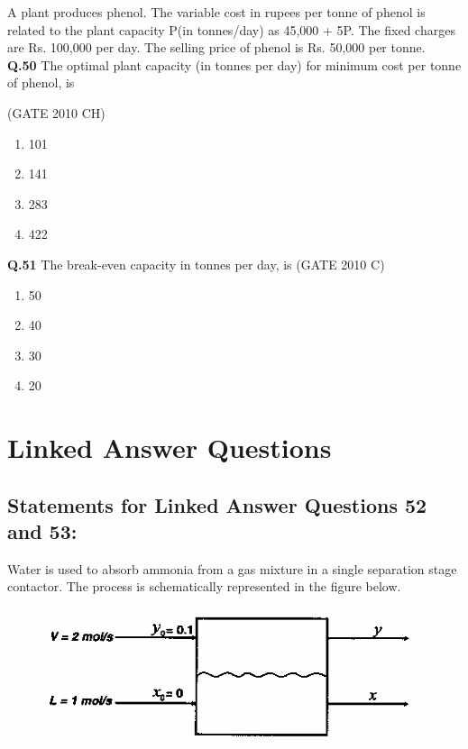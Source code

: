 \documentclass[journal,12pt,onecolumn]{exam}
\theoremstyle{remark}
\begin{document}
A plant produces phenol. The variable cost in rupees per tonne of phenol is related to the plant capacity P(in tonnes/day) as 45,000 + 5P. The fixed charges are Rs. 100,000 per day. The selling price of phenol is Rs. 50,000 per tonne.\\

\noindent
\textbf{Q.50}
 The optimal plant capacity (in tonnes per day) for minimum cost per tonne of phenol, is
   
 \hfill{(GATE 2010 CH)}\\

\begin{enumerate}
    \item 101
    \item 141
    \item 283
    \item 422
\end{enumerate}

\noindent
\textbf{Q.51}
 The break-even capacity in tonnes per day, is
\hfill{(GATE 2010 C)}\\

\begin{enumerate}
    \item 50
    \item 40
    \item 30
    \item 20
    
\end{enumerate}

\section{Linked Answer Questions }
  \subsection{ Statements for Linked Answer Questions 52 and 53:} 

 Water is used to absorb ammonia from a gas mixture in a single separation stage contactor. The process is schematically represented in the figure below.

  \includegraphics[width=1.0\linewidth]{images/Q.52 image.png}\\
\end{document}
